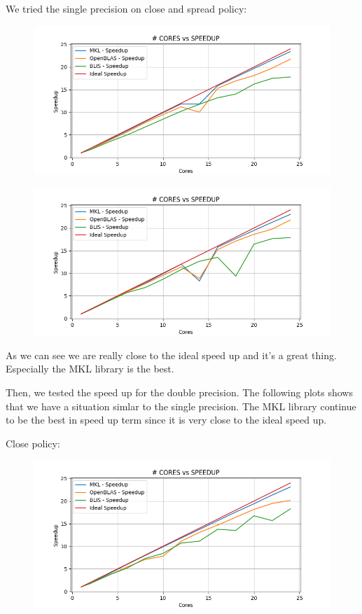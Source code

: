 \documentclass{article}
\begin{document}
We tried the single precision on close and spread policy: 
\begin{figure}[H]
    \centering
    \includegraphics[width=\textwidth]{THIN speedUp/sgemm_mkl.x_THIN_10000_close_detailed__speedUp.png}
\end{figure}

\begin{figure}[H]
    \centering
    \includegraphics[width=\textwidth]{THIN speedUp/sgemm_mkl.x_THIN_10000_spread_detailed__speedUp.png}
\end{figure}

As we can see we are really close to the ideal speed up and it's a great thing. Especially the MKL library is the best.

Then, we tested the speed up for the double precision. The following plots shows that we have a situation simlar to the single precision. The MKL library continue to be the best in speed up term since it is very close to the ideal speed up.

Close policy:
\begin{figure}[H]
    \centering
    \includegraphics[width=\textwidth]{THIN speedUp/dgemm_mkl.x_THIN_10000_close_detailed__speedUp.png}
\end{figure}
\end{document}
